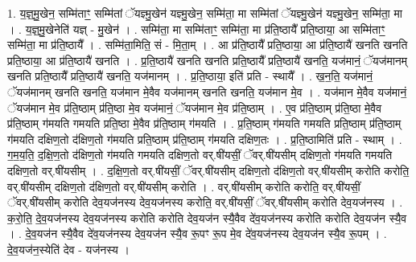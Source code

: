 \documentclass[17pt]{extarticle}
\begin{document}
1. य॒ज्ञ्॒मु॒खेन॒ सम्मि॑ताꣳ॒॒ सम्मि॑तां ॅयज्ञ्मु॒खेन॑ यज्ञ्मु॒खेन॒ सम्मि॑ता॒ मा सम्मि॑तां ॅयज्ञ्मु॒खेन॑ यज्ञ्मु॒खेन॒ सम्मि॑ता॒ मा । . य॒ज्ञ्॒मु॒खेनेति॑ यज्ञ् - मु॒खेन॑ । . सम्मि॑ता॒ मा सम्मि॑ताꣳ॒॒ सम्मि॑ता॒ मा प्र॑ति॒ष्ठायै᳚ प्रति॒ष्ठाया॒ आ सम्मि॑ताꣳ॒॒ सम्मि॑ता॒ मा प्र॑ति॒ष्ठायै᳚ । . सम्मि॑ता॒मिति॒ सं - मि॒ता॒म् । . आ प्र॑ति॒ष्ठायै᳚ प्रति॒ष्ठाया॒ आ प्र॑ति॒ष्ठायै॑ खनति खनति प्रति॒ष्ठाया॒ आ प्र॑ति॒ष्ठायै॑ खनति । . प्र॒ति॒ष्ठायै॑ खनति खनति प्रति॒ष्ठायै᳚ प्रति॒ष्ठायै॑ खनति॒ यज॑मानं॒ ॅयज॑मानम् खनति प्रति॒ष्ठायै᳚ प्रति॒ष्ठायै॑ खनति॒ यज॑मानम् । . प्र॒ति॒ष्ठाया॒ इति॑ प्रति - स्थायै᳚ । . ख॒न॒ति॒ यज॑मानं॒ ॅयज॑मानम् खनति खनति॒ यज॑मान मे॒वैव यज॑मानम् खनति खनति॒ यज॑मान मे॒व । . यज॑मान मे॒वैव यज॑मानं॒ ॅयज॑मान मे॒व प्र॑ति॒ष्ठाम् प्र॑ति॒ष्ठा मे॒व यज॑मानं॒ ॅयज॑मान मे॒व प्र॑ति॒ष्ठाम् । . ए॒व प्र॑ति॒ष्ठाम् प्र॑ति॒ष्ठा मे॒वैव प्र॑ति॒ष्ठाम् ग॑मयति गमयति प्रति॒ष्ठा मे॒वैव प्र॑ति॒ष्ठाम् ग॑मयति । . प्र॒ति॒ष्ठाम् ग॑मयति गमयति प्रति॒ष्ठाम् प्र॑ति॒ष्ठाम् ग॑मयति दक्षिण॒तो द॑क्षिण॒तो ग॑मयति प्रति॒ष्ठाम् प्र॑ति॒ष्ठाम् ग॑मयति दक्षिण॒तः । . प्र॒ति॒ष्ठामिति॑ प्रति - स्थाम् । . ग॒म॒य॒ति॒ द॒क्षि॒ण॒तो द॑क्षिण॒तो ग॑मयति गमयति दक्षिण॒तो वर्.षी॑यसीं॒ ॅवर्.षी॑यसीम् दक्षिण॒तो ग॑मयति गमयति दक्षिण॒तो वर्.षी॑यसीम् । . द॒क्षि॒ण॒तो वर्.षी॑यसीं॒ ॅवर्.षी॑यसीम् दक्षिण॒तो द॑क्षिण॒तो वर्.षी॑यसीम् करोति करोति॒ वर्.षी॑यसीम् दक्षिण॒तो द॑क्षिण॒तो वर्.षी॑यसीम् करोति । . वर्.षी॑यसीम् करोति करोति॒ वर्.षी॑यसीं॒ ॅवर्.षी॑यसीम् करोति देव॒यज॑नस्य देव॒यज॑नस्य करोति॒ वर्.षी॑यसीं॒ ॅवर्.षी॑यसीम् करोति देव॒यज॑नस्य । . क॒रो॒ति॒ दे॒व॒यज॑नस्य देव॒यज॑नस्य करोति करोति देव॒यज॑न स्यै॒वैव दे॑व॒यज॑नस्य करोति करोति देव॒यज॑न स्यै॒व । . दे॒व॒यज॑न स्यै॒वैव दे॑व॒यज॑नस्य देव॒यज॑न स्यै॒व रू॒पꣳ रू॒प मे॒व दे॑व॒यज॑नस्य देव॒यज॑न स्यै॒व रू॒पम् । . दे॒व॒यज॑न॒स्येति॑ देव - यज॑नस्य । \newline
\end{document}
